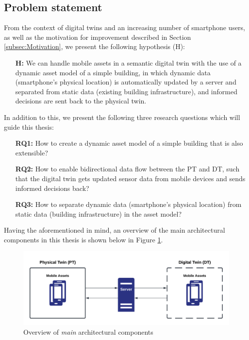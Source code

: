 \documentclass{article}
\begin{document}
\subsection{Problem statement}\label{subsec:ProblemStatement}
From the context of digital twins and an increasing number of smartphone users, as well as the motivation for improvement described in Section \ref{subsec:Motivation}, we present the following hypothesis (H):

\begin{itemize}
    \item[\textbf{H:}] We can handle mobile assets in a semantic digital twin with the use of a dynamic asset model of a simple building, in which dynamic data (smartphone's physical location) is automatically updated by a server and separated from static data (existing building infrastructure), and informed decisions are sent back to the physical twin.
\end{itemize}


In addition to this, we present the following three research questions which will guide this thesis:
\begin{itemize}
    \item[\textbf{RQ1:}]
    How to create a dynamic asset model of a simple building that is also extensible?
    \item [\textbf{RQ2:}] 
    How to enable bidirectional data flow between the PT and DT, such that the digital twin gets updated sensor data from mobile devices and sends informed decisions back?
    \item [\textbf{RQ3:}]
    How to separate dynamic data (smartphone's physical location) from static data (building infrastructure) in the asset model?
\end{itemize}

Having the aforementioned in mind, an overview of the main architectural components in this thesis is shown below in Figure \ref{fig:initial_components}.

\begin{figure}[H]
    \centering
    \includegraphics[scale=0.14]{graphics/initial_thesis_overview.png}
    \caption{Overview of \emph{main} architectural components}
    \label{fig:initial_components}
\end{figure}
\end{document}
